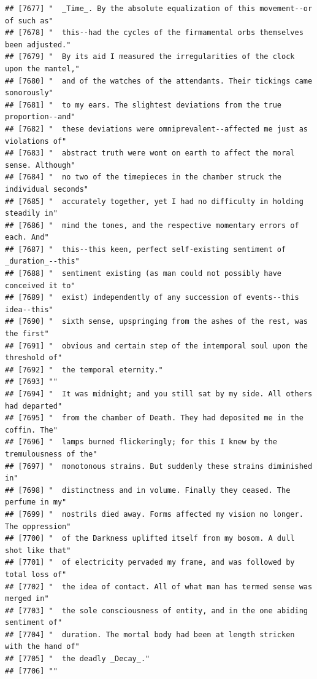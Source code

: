 \documentclass{article}\usepackage[]{graphicx}\usepackage[]{color}
\makeatletter
\newenvironment{kframe}{%
 \def\at@end@of@kframe{}%
 \ifinner\ifhmode%
  \def\at@end@of@kframe{\end{minipage}}%
  \begin{minipage}{\columnwidth}%
 \fi\fi%
 \def\FrameCommand##1{\hskip\@totalleftmargin \hskip-\fboxsep
 \colorbox{shadecolor}{##1}\hskip-\fboxsep
     \hskip-\linewidth \hskip-\@totalleftmargin \hskip\columnwidth}%
 \MakeFramed {\advance\hsize-\width
   \@totalleftmargin\z@ \linewidth\hsize
   \@setminipage}}%
 {\par\unskip\endMakeFramed%
 \at@end@of@kframe}
\newenvironment{knitrout}{}{} %
\makeatother
\begin{document}
\begin{knitrout}
\begin{kframe}
\begin{verbatim}
## [7677] "  _Time_. By the absolute equalization of this movement--or of such as"      
## [7678] "  this--had the cycles of the firmamental orbs themselves been adjusted."    
## [7679] "  By its aid I measured the irregularities of the clock upon the mantel,"    
## [7680] "  and of the watches of the attendants. Their tickings came sonorously"      
## [7681] "  to my ears. The slightest deviations from the true proportion--and"        
## [7682] "  these deviations were omniprevalent--affected me just as violations of"    
## [7683] "  abstract truth were wont on earth to affect the moral sense. Although"     
## [7684] "  no two of the timepieces in the chamber struck the individual seconds"     
## [7685] "  accurately together, yet I had no difficulty in holding steadily in"       
## [7686] "  mind the tones, and the respective momentary errors of each. And"          
## [7687] "  this--this keen, perfect self-existing sentiment of _duration_--this"      
## [7688] "  sentiment existing (as man could not possibly have conceived it to"        
## [7689] "  exist) independently of any succession of events--this idea--this"         
## [7690] "  sixth sense, upspringing from the ashes of the rest, was the first"        
## [7691] "  obvious and certain step of the intemporal soul upon the threshold of"     
## [7692] "  the temporal eternity."                                                    
## [7693] ""                                                                            
## [7694] "  It was midnight; and you still sat by my side. All others had departed"    
## [7695] "  from the chamber of Death. They had deposited me in the coffin. The"       
## [7696] "  lamps burned flickeringly; for this I knew by the tremulousness of the"    
## [7697] "  monotonous strains. But suddenly these strains diminished in"              
## [7698] "  distinctness and in volume. Finally they ceased. The perfume in my"        
## [7699] "  nostrils died away. Forms affected my vision no longer. The oppression"    
## [7700] "  of the Darkness uplifted itself from my bosom. A dull shot like that"      
## [7701] "  of electricity pervaded my frame, and was followed by total loss of"       
## [7702] "  the idea of contact. All of what man has termed sense was merged in"       
## [7703] "  the sole consciousness of entity, and in the one abiding sentiment of"     
## [7704] "  duration. The mortal body had been at length stricken with the hand of"    
## [7705] "  the deadly _Decay_."                                                       
## [7706] ""                                                                            

\end{verbatim}
\end{kframe}
\end{knitrout}
\end{document}
